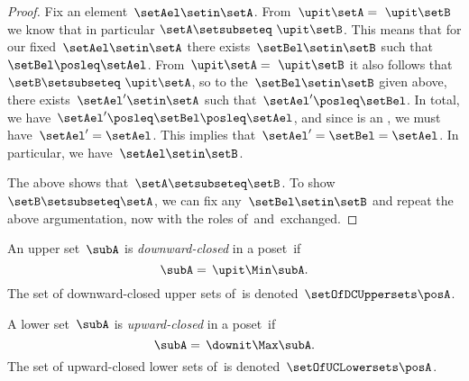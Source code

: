 \begin{proof}
    Fix an element~$\setAel \setin \setA$.
    From~$\upit  \setA = \ \upit  \setB$ we know that in particular $\setA \setsubseteq \ \upit  \setB$.
    This means that for our fixed~$\setAel \setin \setA$ there exists~$\setBel \setin \setB$ such that~$\setBel \posleq \setAel$.
    From~$\upit \setA = \ \upit  \setB$ it also follows that~$\setB \setsubseteq \ \upit  \setA$, so to the~$\setBel \setin \setB$ given above, there exists~$\setAel' \setin \setA$ such that~$\setAel' \posleq \setBel$.
    In total, we have~$\setAel' \posleq \setBel \posleq \setAel$, and since \setA is an , we must have~$\setAel' = \setAel$.
    This implies that~$\setAel' = \setBel = \setAel$.
    In particular, we have~$\setAel \setin \setB$.

    The above shows that~$\setA \setsubseteq \setB$.
    To show~$\setB \setsubseteq \setA$, we can fix any~$\setBel \setin \setB$ and repeat the above argumentation, now with the roles of~\setA and~\setB exchanged.
\end{proof}

\begin{definition}
    \label{def:downward-closed-upperset}
    An upper set~$\subA$ is \emph{downward-closed} in a poset~\posA if
    \begin{equation}
        \subA =\, \upit  \Min \subA.
    \end{equation}
    The set of downward-closed upper sets of~\posA is denoted~$\setOfDCUppersets \posA$.

\end{definition}

\begin{definition}
    \label{def:upward-closed-lowerset}
    A lower set~$\subA$ is \emph{upward-closed} in a poset~\posA if
    \begin{equation}
        \subA =\, \downit  \Max \subA.
    \end{equation}
    The set of upward-closed lower sets of~\posA is denoted~$\setOfUCLowersets \posA$.
\end{definition}
